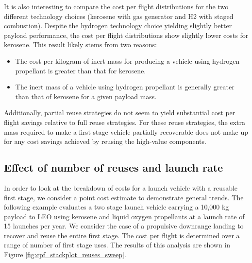 \documentclass[conf]{new-aiaa}
\begin{document}
\begin{multicols}{2}
It is also interesting to compare the cost per flight distributions for the two different technology choices (kerosene with gas generator and H2 with staged combustion). Despite the hydrogen technology choice yielding slightly better payload performance, the cost per flight distributions show slightly lower costs for kerosene. This result likely stems from two reasons:

\begin{itemize}
  \item The cost per kilogram of inert mass for producing a vehicle using hydrogen propellant is greater than that for kerosene. 
  \item The inert mass of a vehicle using hydrogen propellant is generally greater than that of kerosene for a given payload mass.
\end{itemize}

Additionally, partial reuse strategies do not seem to yield substantial cost per flight savings relative to full reuse strategies. For these reuse strategies, the extra mass required to make a first stage vehicle partially recoverable does not make up for any cost savings achieved by reusing the high-value components. 


\subsection{Effect of number of reuses and launch rate}
In order to look at the breakdown of costs for a launch vehicle with a reusable first stage, we consider a point cost estimate to demonstrate general trends. The following example evaluates a two stage launch vehicle carrying a 10,000 kg payload to LEO using kerosene and liquid oxygen propellants at a launch rate of 15 launches per year. We consider the case of a propulsive downrange landing to recover and reuse the entire first stage. The cost per flight is determined over a range of number of first stage uses. The results of this analysis are shown in Figure \ref{fig:cpf_stackplot_reuses_sweep}.


\end{multicols}
\end{document}
